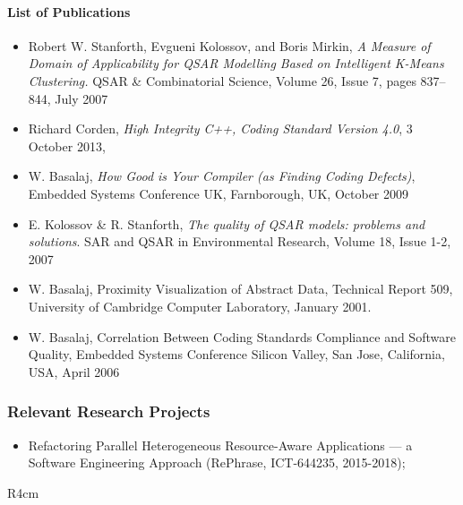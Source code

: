 \documentclass[a4paper,11pt]{article}
\begin{document}
\paragraph{List of Publications}
\begin{itemize}

\item Robert W. Stanforth, Evgueni Kolossov, and Boris Mirkin, \textit{A Measure of Domain of Applicability for QSAR Modelling Based on Intelligent K-Means Clustering.} 
QSAR \& Combinatorial Science, Volume 26, Issue 7, pages 837--844, July 2007

\item Richard Corden, \textit{High Integrity C++, Coding Standard Version 4.0}, 3 October 2013, \PRshort{}
\item W. Basalaj, \textit{How Good is Your Compiler (as Finding Coding Defects)}, Embedded Systems Conference UK, Farnborough, UK, October 2009
\item E. Kolossov \& R. Stanforth, \textit{The quality of QSAR models: problems and solutions}. SAR and QSAR in Environmental Research, Volume 18, Issue 1-2, 2007 
\item W. Basalaj, Proximity Visualization of Abstract Data, Technical Report 509, University of Cambridge Computer Laboratory, January 2001.
\item W. Basalaj, Correlation Between Coding Standards Compliance and Software Quality, Embedded Systems Conference Silicon Valley, San Jose, California, USA, April 2006

\end{itemize}

\subsubsection*{Relevant Research Projects}

\begin{itemize}
\item
Refactoring Parallel Heterogeneous Resource-Aware Applications --- a Software Engineering Approach (RePhrase, ICT-644235, 2015-2018);
\end{itemize}




\begin{wrapfigure}{R}{4cm}
\vspace{-2cm}
\hfill {}
\vspace{-1cm}
\end{wrapfigure}
\end{document}
